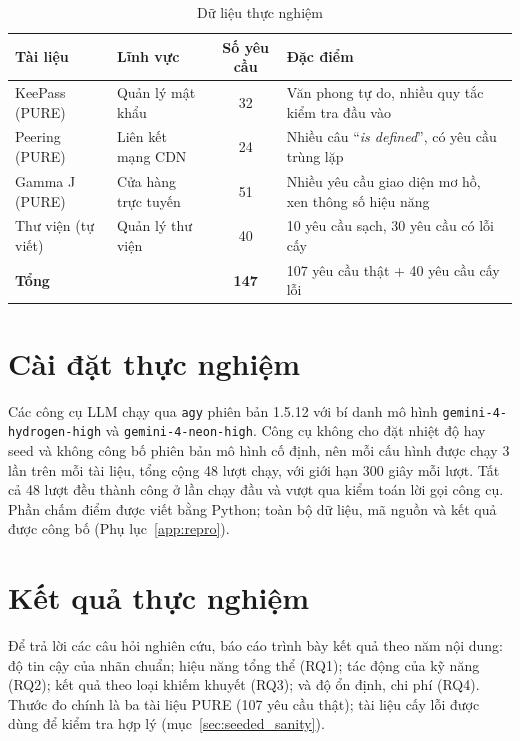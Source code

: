 \documentclass[12pt,a4paper]{report}
\begin{document}
\begin{table}[H]
\centering
\caption{Dữ liệu thực nghiệm}
\label{tab:dataset}
\small
\begin{tabular}{p{2.8cm}p{3.2cm}cp{6.4cm}}
\toprule
\textbf{Tài liệu} & \textbf{Lĩnh vực} & \textbf{Số yêu cầu} & \textbf{Đặc điểm} \\
\midrule
KeePass (PURE) & Quản lý mật khẩu & 32 & Văn phong tự do, nhiều quy tắc kiểm tra đầu vào \\
Peering (PURE) & Liên kết mạng CDN & 24 & Nhiều câu ``\textit{is defined}'', có yêu cầu trùng lặp \\
Gamma J (PURE) & Cửa hàng trực tuyến & 51 & Nhiều yêu cầu giao diện mơ hồ, xen thông số hiệu năng \\
\midrule
Thư viện (tự viết) & Quản lý thư viện & 40 & 10 yêu cầu sạch, 30 yêu cầu có lỗi cấy \\
\midrule
\textbf{Tổng} & & \textbf{147} & 107 yêu cầu thật + 40 yêu cầu cấy lỗi \\
\bottomrule
\end{tabular}
\end{table}

\section{Cài đặt thực nghiệm}
Các công cụ LLM chạy qua \texttt{agy} phiên bản 1.5.12 với bí danh mô hình \texttt{gemini-4-\allowbreak hydrogen-\allowbreak high} và \texttt{gemini-4-\allowbreak neon-\allowbreak high}. Công cụ không cho đặt nhiệt độ hay seed và không công bố phiên bản mô hình cố định, nên mỗi cấu hình được chạy 3 lần trên mỗi tài liệu, tổng cộng 48 lượt chạy, với giới hạn 300 giây mỗi lượt. Tất cả 48 lượt đều thành công ở lần chạy đầu và vượt qua kiểm toán lời gọi công cụ. Phần chấm điểm được viết bằng Python; toàn bộ dữ liệu, mã nguồn và kết quả được công bố (Phụ lục~\ref{app:repro}).

\section{Kết quả thực nghiệm}
Để trả lời các câu hỏi nghiên cứu, báo cáo trình bày kết quả theo năm nội dung: độ tin cậy của nhãn chuẩn; hiệu năng tổng thể (RQ1); tác động của kỹ năng (RQ2); kết quả theo loại khiếm khuyết (RQ3); và độ ổn định, chi phí (RQ4). Thước đo chính là ba tài liệu PURE (107 yêu cầu thật); tài liệu cấy lỗi được dùng để kiểm tra hợp lý (mục~\ref{sec:seeded_sanity}).
\end{document}
